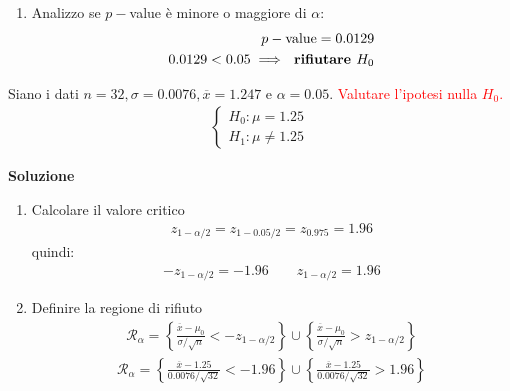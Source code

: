 \documentclass{article}  %
\theoremstyle{definition}
\begin{document}
\begin{esercizio}
\begin{enumerate}
\begin{align*}
			                                                  & = 1- \phi(2.233)      \\
			                                                  & = 1 - 0.9871 = 0.0129
		      \end{align*}
		\item Analizzo se $p-$value è minore o maggiore di $\alpha$:
		      \begin{align*}
			      p-\text{value} = 0.0129 \\
			      0.0129 < 0.05 \implies \text{\textbf{ rifiutare $H_0$}}
		      \end{align*}
	\end{enumerate}
\end{esercizio}

\begin{esercizio}
	Siano i dati $n=32, \sigma=0.0076, \overline{x}=1.247$ e $\alpha=0.05$.
	\textcolor{red}{Valutare
		l'ipotesi nulla $H_0$.}
	\begin{align*}
		\begin{cases}
			H_0: \mu = 1.25 \\
			H_1: \mu \neq 1.25
		\end{cases}
	\end{align*}
	\begin{center}
		\textbf{Soluzione}
	\end{center}
	\begin{enumerate}
		\item Calcolare il valore critico
		      \begin{align*}
			      z_{1-\alpha/2}=z_{1-0.05/2}=z_{0.975}=1.96
		      \end{align*}
		      quindi:
		      \begin{align*}
			      -z_{1-\alpha/2}=-1.96 \quad \quad z_{1-\alpha/2}=1.96
		      \end{align*}
		\item Definire la regione di rifiuto
		      \begin{align*}
			      \mathcal{R}_{\alpha}=\left\{\frac{\overline{x}-\mu_0}{\sigma/\sqrt{n}} < -z_{1-\alpha/2} \right\} \cup \left\{\frac{\overline{x}-\mu_0}{\sigma/\sqrt{n}} > z_{1-\alpha/2} \right\}
		      \end{align*}
		      \begin{align*}
			      \mathcal{R}_{\alpha}=\left\{\frac{\overline{x}-1.25}{0.0076/\sqrt{32}} < -1.96 \right\} \cup \left\{\frac{\overline{x}-1.25}{0.0076/\sqrt{32}} > 1.96 \right\}

\end{align*}
\end{enumerate}
\end{esercizio}
\end{document}
